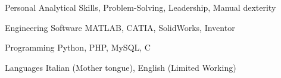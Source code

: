 

\begin{cvskills}

  \cvskill
  {Personal} %
  {Analytical Skills, Problem-Solving, Leadership, Manual dexterity} %

  \cvskill
  {Engineering Software} %
  {MATLAB, CATIA, SolidWorks, Inventor} %

  \cvskill
  {Programming} %
  {Python, PHP, MySQL, C} %

  \cvskill
  {Languages} %
  {Italian (Mother tongue), English (Limited Working)} %

\end{cvskills}

